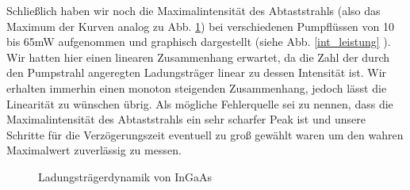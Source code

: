 Schließlich haben wir noch die Maximalintensität des Abtaststrahls (also das Maximum der Kurven analog zu Abb. \ref{zerfall}) bei verschiedenen Pumpflüssen von 10 bis 65mW aufgenommen und graphisch dargestellt (siehe Abb. \ref{int_leistung} ). Wir hatten hier einen linearen Zusammenhang erwartet, da die Zahl der durch den Pumpstrahl angeregten Ladungsträger linear zu dessen Intensität ist. Wir erhalten immerhin einen monoton steigenden Zusammenhang, jedoch lässt die Linearität zu wünschen übrig. Als mögliche Fehlerquelle sei zu nennen, dass die Maximalintensität des Abtaststrahls ein sehr scharfer Peak ist und unsere Schritte für die Verzögerungszeit eventuell zu groß gewählt waren um den wahren Maximalwert zuverlässig zu messen.

%

\begin{figure}
  \centering
  \caption{Ladungsträgerdynamik von InGaAs}
  \label{zerfall}
\end{figure}


